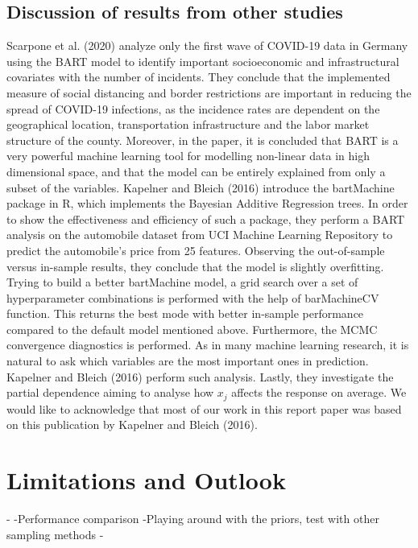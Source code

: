 \documentclass{usiinftr}
\begin{document}
\subsection{Discussion of results from other studies}
Scarpone et al. (2020) analyze only the first wave of COVID-19 data in Germany using the BART model to identify important socioeconomic and infrastructural covariates with the number of incidents. They conclude that the implemented measure of social distancing and border restrictions are important in reducing the spread of COVID-19 infections, as the incidence rates are dependent on the geographical location, transportation infrastructure and the labor market structure of the county. Moreover, in the paper, it is concluded that BART is a very powerful machine learning tool for modelling non-linear data in high dimensional space, and that the model can be entirely explained from only a subset of the variables.  
Kapelner and Bleich (2016) introduce the bartMachine package in R, which implements the Bayesian Additive Regression trees.  In order to show the effectiveness and efficiency of such a package, they perform a BART analysis on the automobile dataset from UCI Machine Learning Repository to predict the automobile's price from 25 features. Observing the out-of-sample versus in-sample results, they conclude that the model is slightly overfitting. Trying to build a better bartMachine model, a grid search over a set of hyperparameter combinations is performed with the help of barMachineCV function. This returns the best mode with better in-sample performance compared to the default model mentioned above. Furthermore, the MCMC convergence diagnostics is performed. As in many machine learning research, it is natural to ask which variables are the most important ones in prediction. Kapelner and Bleich (2016) perform such analysis. Lastly, they investigate the partial dependence aiming to analyse how $x_j$ affects the response on average. We would like to acknowledge that most of our work in this report paper was based on this publication by Kapelner and Bleich (2016). 

\section{Limitations and Outlook}
-
-Performance comparison 
-Playing around with the priors, test with other sampling methods
-
\end{document}
